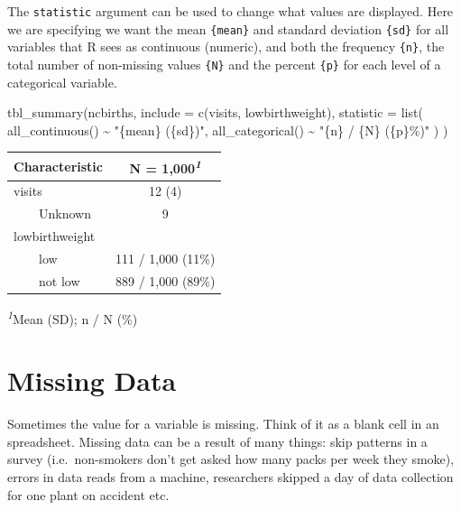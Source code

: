 \documentclass[
  letterpaper,
  DIV=11,
  numbers=noendperiod,
  oneside]{scrreprt}
\newenvironment{Shaded}{\begin{snugshade}}{\end{snugshade}}
\newcommand{\AttributeTok}[1]{\textcolor[rgb]{0.40,0.45,0.13}{#1}}
\newcommand{\FunctionTok}[1]{\textcolor[rgb]{0.28,0.35,0.67}{#1}}
\newcommand{\NormalTok}[1]{\textcolor[rgb]{0.00,0.23,0.31}{#1}}
\newcommand{\SpecialCharTok}[1]{\textcolor[rgb]{0.37,0.37,0.37}{#1}}
\newcommand{\StringTok}[1]{\textcolor[rgb]{0.13,0.47,0.30}{#1}}
\begin{document}
The \texttt{statistic} argument can be used to change what values are
displayed. Here we are specifying we want the mean \texttt{\{mean\}} and
standard deviation \texttt{\{sd\}} for all variables that R sees as
continuous (numeric), and both the frequency \texttt{\{n\}}, the total
number of non-missing values \texttt{\{N\}} and the percent
\texttt{\{p\}} for each level of a categorical variable.

\begin{Shaded}
\begin{Highlighting}[]
\FunctionTok{tbl\_summary}\NormalTok{(ncbirths, }
            \AttributeTok{include =} \FunctionTok{c}\NormalTok{(visits, lowbirthweight), }
            \AttributeTok{statistic =} \FunctionTok{list}\NormalTok{(}
                \FunctionTok{all\_continuous}\NormalTok{() }\SpecialCharTok{\textasciitilde{}} \StringTok{"\{mean\} (\{sd\})"}\NormalTok{,}
                \FunctionTok{all\_categorical}\NormalTok{() }\SpecialCharTok{\textasciitilde{}} \StringTok{"\{n\} / \{N\} (\{p\}\%)"}
\NormalTok{              )}
\NormalTok{            )}
\end{Highlighting}
\end{Shaded}

\begin{table}
\fontsize{12.0pt}{14.4pt}\selectfont
\begin{tabular*}{\linewidth}{@{\extracolsep{\fill}}lc}
\toprule
\textbf{Characteristic} & \textbf{N = 1,000}\textsuperscript{\textit{1}} \\ 
\midrule\addlinespace[2.5pt]
visits & 12 (4) \\ 
    Unknown & 9 \\ 
lowbirthweight &  \\ 
    low & 111 / 1,000 (11\%) \\ 
    not low & 889 / 1,000 (89\%) \\ 
\bottomrule
\end{tabular*}
\begin{minipage}{\linewidth}
\textsuperscript{\textit{1}}Mean (SD); n / N (\%)\\
\end{minipage}
\end{table}

\section{Missing Data}\label{missing-data}

Sometimes the value for a variable is missing. Think of it as a blank
cell in an spreadsheet. Missing data can be a result of many things:
skip patterns in a survey (i.e.~non-smokers don't get asked how many
packs per week they smoke), errors in data reads from a machine,
researchers skipped a day of data collection for one plant on accident
etc.
\end{document}
